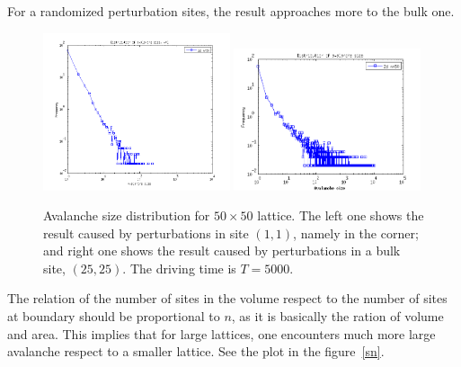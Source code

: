 For a randomized perturbation sites, the result approaches more to the bulk one. 
\begin{figure} 
\begin{center}
\includegraphics[width=0.49\textwidth]{results/sv1.png}
\includegraphics[width=0.49\textwidth]{results/sbulk.png} 
\caption{Avalanche size distribution for $50\times50$ lattice. 
The left one shows the result caused by perturbations in site $(1,1)$, namely in the corner; 
and right one shows the result caused by perturbations in a bulk site, $(25,25)$. The driving time is $T=5000$.  }
\label{sv}
\end{center}
\end{figure} 


The relation of the number of sites in the volume respect to the number of sites at boundary should be proportional to $n$, as it is basically the ration of volume and area.
This implies that for large lattices, one encounters much more large avalanche respect to a smaller lattice. See the plot in the figure~\ref{sn}.

